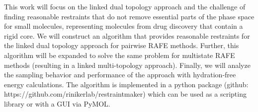 This work will focus on the linked dual topology approach and the challenge of finding reasonable restraints that do not remove essential parts of the phase space for small molecules, representing molecules from drug discovery that contain a rigid core. 
We will construct an algorithm that provides reasonable restraints for the linked dual topology approach for pairwise RAFE methods. Further, this algorithm will be expanded to solve the same problem for multistate RAFE methods (resulting in a linked multi-topology approach). Finally, we will analyze the sampling behavior and performance of the approach with hydration-free energy calculations. The algorithm is implemented in a  python package (github: https://github.com/rinikerlab/restraintmaker) which can be used as a scripting library or with a GUI via PyMOL. \cite{DeLano2020}